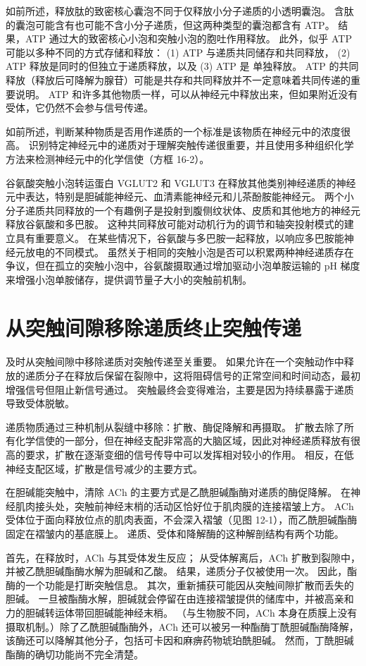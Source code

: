 如前所述，释放肽的致密核心囊泡不同于仅释放小分子递质的小透明囊泡。 
含肽的囊泡可能含有也可能不含小分子递质，但这两种类型的囊泡都含有 ATP。 
结果，ATP 通过大的致密核心小泡和突触小泡的胞吐作用释放。 
此外，似乎 ATP 可能以多种不同的方式存储和释放：
(1) ATP 与递质共同储存和共同释放，
(2) ATP 释放是同时的但独立于递质释放，以及 
(3) ATP 是 单独释放。 
ATP 的共同释放（释放后可降解为腺苷）可能是共存和共同释放并不一定意味着共同传递的重要说明。 
ATP 和许多其他物质一样，可以从神经元中释放出来，但如果附近没有受体，它仍然不会参与信号传递。


如前所述，判断某种物质是否用作递质的一个标准是该物质在神经元中的浓度很高。 
识别特定神经元中的递质对于理解突触传递很重要，并且使用多种组织化学方法来检测神经元中的化学信使（方框 16-2）。


谷氨酸突触小泡转运蛋白 VGLUT2 和 VGLUT3 在释放其他类别神经递质的神经元中表达，特别是胆碱能神经元、血清素能神经元和儿茶酚胺能神经元。 
两个小分子递质共同释放的一个有趣例子是投射到腹侧纹状体、皮质和其他地方的神经元释放谷氨酸和多巴胺。 这种共同释放可能对动机行为的调节和轴突投射模式的建立具有重要意义。 
在某些情况下，谷氨酸与多巴胺一起释放，以响应多巴胺能神经元放电的不同模式。 
虽然关于相同的突触小泡是否可以积累两种神经递质存在争议，但在孤立的突触小泡中，谷氨酸摄取通过增加驱动小泡单胺运输的 pH 梯度来增强小泡单胺储存，提供调节量子大小的突触前机制。



\section{从突触间隙移除递质终止突触传递}
及时从突触间隙中移除递质对突触传递至关重要。 
如果允许在一个突触动作中释放的递质分子在释放后保留在裂隙中，这将阻碍信号的正常空间和时间动态，最初增强信号但阻止新信号通过。 
突触最终会变得难治，主要是因为持续暴露于递质导致受体脱敏。


递质物质通过三种机制从裂缝中移除：扩散、酶促降解和再摄取。 
扩散去除了所有化学信使的一部分，但在神经支配非常高的大脑区域，因此对神经递质释放有很高的要求，扩散在逐渐变细的信号传导中可以发挥相对较小的作用。 
相反，在低神经支配区域，扩散是信号减少的主要方式。


在胆碱能突触中，清除 ACh 的主要方式是乙酰胆碱酯酶对递质的酶促降解。 
在神经肌肉接头处，突触前神经末梢的活动区恰好位于肌肉膜的连接褶皱上方。 
ACh 受体位于面向释放位点的肌肉表面，不会深入褶皱（见图 12-1），而乙酰胆碱酯酶固定在褶皱内的基底膜上。 递质、受体和降解酶的这种解剖结构有两个功能。


首先，在释放时，ACh 与其受体发生反应； 
从受体解离后，ACh 扩散到裂隙中，并被乙酰胆碱酯酶水解为胆碱和乙酸。 
结果，递质分子仅被使用一次。 
因此，酯酶的一个功能是打断突触信息。 
其次，重新捕获可能因从突触间隙扩散而丢失的胆碱。 
一旦被酯酶水解，胆碱就会停留在由连接褶皱提供的储库中，并被高亲和力的胆碱转运体带回胆碱能神经末梢。 
（与生物胺不同，ACh 本身在质膜上没有摄取机制。）除了乙酰胆碱酯酶外，ACh 还可以被另一种酯酶丁酰胆碱酯酶降解，该酶还可以降解其他分子，包括可卡因和麻痹药物琥珀酰胆碱。 
然而，丁酰胆碱酯酶的确切功能尚不完全清楚。


